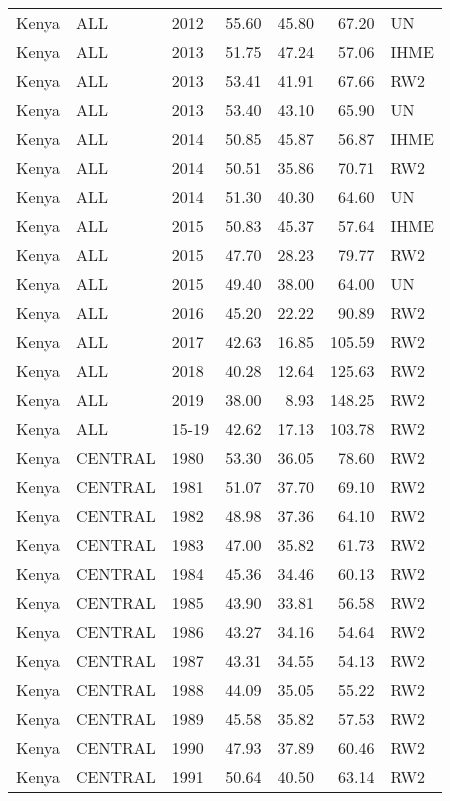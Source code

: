 \begin{longtable}{lllrrrl}
  Kenya & ALL & 2012 & 55.60 & 45.80 & 67.20 & UN \\ 
  Kenya & ALL & 2013 & 51.75 & 47.24 & 57.06 & IHME \\ 
  Kenya & ALL & 2013 & 53.41 & 41.91 & 67.66 & RW2 \\ 
  Kenya & ALL & 2013 & 53.40 & 43.10 & 65.90 & UN \\ 
  Kenya & ALL & 2014 & 50.85 & 45.87 & 56.87 & IHME \\ 
  Kenya & ALL & 2014 & 50.51 & 35.86 & 70.71 & RW2 \\ 
  Kenya & ALL & 2014 & 51.30 & 40.30 & 64.60 & UN \\ 
  Kenya & ALL & 2015 & 50.83 & 45.37 & 57.64 & IHME \\ 
  Kenya & ALL & 2015 & 47.70 & 28.23 & 79.77 & RW2 \\ 
  Kenya & ALL & 2015 & 49.40 & 38.00 & 64.00 & UN \\ 
  Kenya & ALL & 2016 & 45.20 & 22.22 & 90.89 & RW2 \\ 
  Kenya & ALL & 2017 & 42.63 & 16.85 & 105.59 & RW2 \\ 
  Kenya & ALL & 2018 & 40.28 & 12.64 & 125.63 & RW2 \\ 
  Kenya & ALL & 2019 & 38.00 & 8.93 & 148.25 & RW2 \\ 
  Kenya & ALL & 15-19 & 42.62 & 17.13 & 103.78 & RW2 \\ 
  Kenya & CENTRAL & 1980 & 53.30 & 36.05 & 78.60 & RW2 \\ 
  Kenya & CENTRAL & 1981 & 51.07 & 37.70 & 69.10 & RW2 \\ 
  Kenya & CENTRAL & 1982 & 48.98 & 37.36 & 64.10 & RW2 \\ 
  Kenya & CENTRAL & 1983 & 47.00 & 35.82 & 61.73 & RW2 \\ 
  Kenya & CENTRAL & 1984 & 45.36 & 34.46 & 60.13 & RW2 \\ 
  Kenya & CENTRAL & 1985 & 43.90 & 33.81 & 56.58 & RW2 \\ 
  Kenya & CENTRAL & 1986 & 43.27 & 34.16 & 54.64 & RW2 \\ 
  Kenya & CENTRAL & 1987 & 43.31 & 34.55 & 54.13 & RW2 \\ 
  Kenya & CENTRAL & 1988 & 44.09 & 35.05 & 55.22 & RW2 \\ 
  Kenya & CENTRAL & 1989 & 45.58 & 35.82 & 57.53 & RW2 \\ 
  Kenya & CENTRAL & 1990 & 47.93 & 37.89 & 60.46 & RW2 \\ 
  Kenya & CENTRAL & 1991 & 50.64 & 40.50 & 63.14 & RW2 \\ 

\end{longtable}
